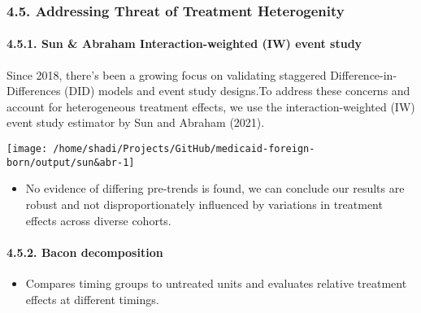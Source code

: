 \documentclass[
]{article}
\providecommand{\tightlist}{%
  \setlength{\itemsep}{0pt}\setlength{\parskip}{0pt}}
\begin{document}
\hypertarget{addressing-threat-of-treatment-heterogenity}{%
\subsubsection{4.5. Addressing Threat of Treatment
Heterogenity}\label{addressing-threat-of-treatment-heterogenity}}

\hypertarget{sun-abraham-interaction-weighted-iw-event-study}{%
\paragraph{4.5.1. Sun \& Abraham Interaction-weighted (IW) event
study}\label{sun-abraham-interaction-weighted-iw-event-study}}

Since 2018, there's been a growing focus on validating staggered
Difference-in-Differences (DID) models and event study designs.To
address these concerns and account for heterogeneous treatment effects,
we use the interaction-weighted (IW) event study estimator by Sun and
Abraham (2021).

\begin{center}\texttt{[image: /home/shadi/Projects/GitHub/medicaid-foreign-born/output/sun\&abr-1]} \end{center}

\begin{itemize}
\tightlist
\item
  No evidence of differing pre-trends is found, we can conclude our
  results are robust and not disproportionately influenced by variations
  in treatment effects across diverse cohorts.
\end{itemize}

\hypertarget{bacon-decomposition}{%
\paragraph{4.5.2. Bacon decomposition}\label{bacon-decomposition}}

\begin{itemize}
\tightlist
\item
  Compares timing groups to untreated units and evaluates relative
  treatment effects at different timings.
\end{itemize}
\end{document}
